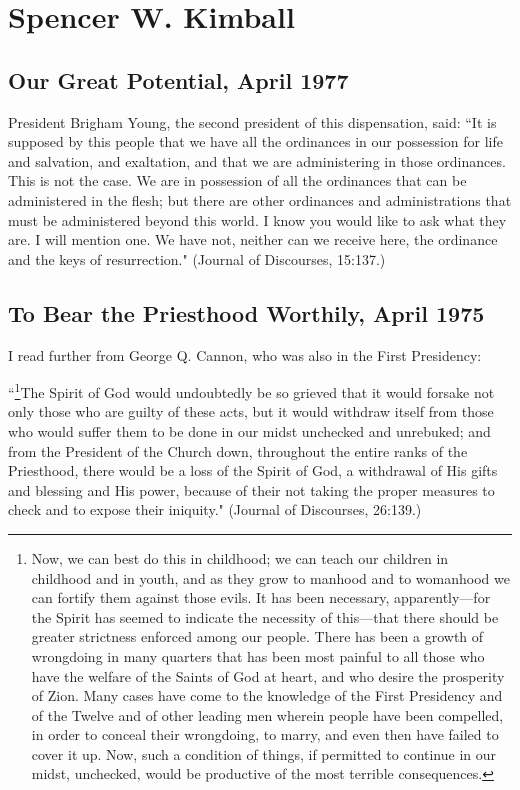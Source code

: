 \section{Spencer W. Kimball}

\subsection{Our Great Potential, April 1977}

President Brigham Young, the second president of this dispensation, said: ``It is supposed by this people that we have all the ordinances in our possession for life and salvation, and exaltation, and that we are administering in those ordinances. This is not the case. We are in possession of all the ordinances that can be administered in the flesh; but there are other ordinances and administrations that must be administered beyond this world. I know you would like to ask what they are. I will mention one. We have not, neither can we receive here, the ordinance and the keys of resurrection." (Journal of Discourses, 15:137.)

\subsection{To Bear the Priesthood Worthily, April 1975}

I read further from George Q. Cannon, who was also in the First Presidency:

``\footnote{Now, we can best do this in childhood; we can teach our children in childhood and in youth, and as they grow to manhood and to womanhood we can fortify them against those evils. It has been necessary, apparently—for the Spirit has seemed to indicate the necessity of this—that there should be greater strictness enforced among our people. There has been a growth of wrongdoing in many quarters that has been most painful to all those who have the welfare of the Saints of God at heart, and who desire the prosperity of Zion. Many cases have come to the knowledge of the First Presidency and of the Twelve and of other leading men wherein people have been compelled, in order to conceal their wrongdoing, to marry, and even then have failed to cover it up. Now, such a condition of things, if permitted to continue in our midst, unchecked, would be productive of the most terrible consequences.}The Spirit of God would undoubtedly be so grieved that it would forsake not only those who are guilty of these acts, but it would withdraw itself from those who would suffer them to be done in our midst unchecked and unrebuked; and from the President of the Church down, throughout the entire ranks of the Priesthood, there would be a loss of the Spirit of God, a withdrawal of His gifts and blessing and His power, because of their not taking the proper measures to check and to expose their iniquity." (Journal of Discourses, 26:139.)